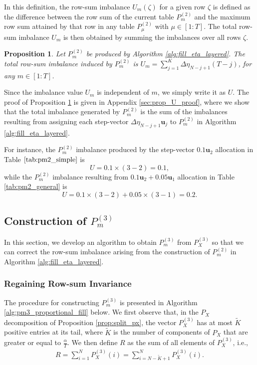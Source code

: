 \documentclass[11pt,letterpaper]{article}
\newtheorem{prop}{\textbf{Proposition}}
\begin{document}
In this definition, the row-sum imbalance $U_m(\zeta)$ for a given row $\zeta$ is defined as the difference between the row sum of the current table $P_m^{(2)}$ and the maximum row sum attained by that row in any table $P_{\mu}^{(2)}$ with $\mu \in [1:T]$. The total row-sum imbalance $U_m$ is then obtained by summing the imbalances over all rows $\zeta$.

\begin{prop} \label{prop:U_value}
Let $P_m^{(2)}$ be produced by Algorithm \ref{alg:fill_eta_layered}. The total row-sum imbalance induced by $P_m^{(2)}$ is $U_m = \sum_{j=1}^{K} \Delta\eta_{N-j+1}(T-j)$, for any $m \in [1:T]$.
\end{prop}

Since the imbalance value $U_m$ is independent of $m$, we simply write it as $U$.  The proof of Proposition \ref{prop:U_value} is given in Appendix \ref{sec:prop_U_proof}, where we show that the total imbalance generated by $P_m^{(2)}$ is the sum of the imbalances resulting from assigning each step-vector $\Delta\eta_{N-j+1}\boldsymbol{u}_j$ to $P_m^{(2)}$ in Algorithm \ref{alg:fill_eta_layered}.  



For instance, the $P_m^{(2)}$ imbalance produced by the step-vector $0.1\boldsymbol{u}_2$ allocation in Table $\ref{tab:pm2_simple}$ is
\[ U = 0.1 \times (3-2) = 0.1, \]
while the $P_m^{(2)}$ imbalance resulting from  $0.1\boldsymbol{u}_2 + 0.05\boldsymbol{u}_1$ allocation in Table \ref{tab:pm2_general} is
\[ U = 0.1 \times (3-2) + 0.05 \times (3-1) = 0.2. \]

\subsection{Construction of $P_m^{(3)}$}

In this section, we develop an algorithm to obtain $P_m^{(3)}$ from $P_X^{(3)}$ so that we can correct the row-sum imbalance arising from the construction of $P_m^{(2)}$ in Algorithm \ref{alg:fill_eta_layered}.

\subsubsection{Regaining Row-sum Invariance}

 The procedure for constructing $P_m^{(3)}$ is presented in Algorithm \ref{alg:pm3_proportional_fill} below. We first observe that, in the $P_X$ decomposition of Proposition \ref{prop:split_px}, the vector $P_X^{(3)}$ has at most $\tilde{K}$ positive entries at its tail, where $\tilde{K}$ is the number of components of $P_X$ that are greater or equal to $\tfrac{\alpha}{T}$. We then define $R$ as the sum of all elements of $P_X^{(3)}$, i.e.,
\begin{align}
    R = \sum_{i = 1}^N P_X^{(3)}(i) = \sum_{i = N-\tilde{K}+1}^N P_X^{(3)}(i).
\end{align}
\end{document}
